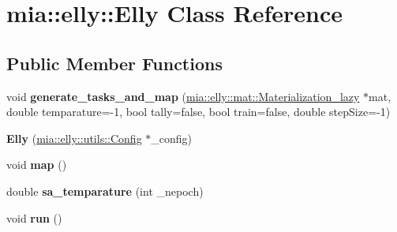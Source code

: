 \hypertarget{classmia_1_1elly_1_1_elly}{\section{mia\-:\-:elly\-:\-:Elly Class Reference}
\label{classmia_1_1elly_1_1_elly}
}
\subsection*{Public Member Functions}
\begin{DoxyCompactItemize}
\item 
\hypertarget{classmia_1_1elly_1_1_elly_a3b7f9dad7a69a8c6f6063a4568df69af}{void {\bfseries generate\-\_\-tasks\-\_\-and\-\_\-map} (\hyperlink{classmia_1_1elly_1_1mat_1_1_materialization__lazy}{mia\-::elly\-::mat\-::\-Materialization\-\_\-lazy} $\ast$mat, double temparature=-\/1, bool tally=false, bool train=false, double step\-Size=-\/1)}\label{classmia_1_1elly_1_1_elly_a3b7f9dad7a69a8c6f6063a4568df69af}

\item 
\hypertarget{classmia_1_1elly_1_1_elly_a6a66d52e4d4c84aee9360b12bacb8182}{{\bfseries Elly} (\hyperlink{classmia_1_1elly_1_1utils_1_1_config}{mia\-::elly\-::utils\-::\-Config} $\ast$\-\_\-config)}\label{classmia_1_1elly_1_1_elly_a6a66d52e4d4c84aee9360b12bacb8182}

\item 
\hypertarget{classmia_1_1elly_1_1_elly_aae3ca29aa589d10b32e8680725b8bcbc}{void {\bfseries map} ()}\label{classmia_1_1elly_1_1_elly_aae3ca29aa589d10b32e8680725b8bcbc}

\item 
\hypertarget{classmia_1_1elly_1_1_elly_aac1929f8be3fdafd7cc248877fb8c11c}{double {\bfseries sa\-\_\-temparature} (int \-\_\-nepoch)}\label{classmia_1_1elly_1_1_elly_aac1929f8be3fdafd7cc248877fb8c11c}

\item 
\hypertarget{classmia_1_1elly_1_1_elly_aa4da10a8b2e063f632da73f369dcf508}{void {\bfseries run} ()}\label{classmia_1_1elly_1_1_elly_aa4da10a8b2e063f632da73f369dcf508}

\end{DoxyCompactItemize}
